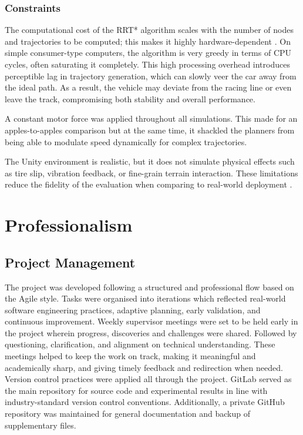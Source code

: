 \documentclass[a4paper,11pt]{report}
\begin{document}
\subsection{Constraints}

The computational cost of the RRT* algorithm scales with the number of nodes and trajectories to be computed; this makes 
it highly hardware-dependent \cite{reference3}. On simple consumer-type computers, the algorithm is very greedy in terms of CPU cycles, often saturating it completely. 
This high processing overhead introduces perceptible lag in trajectory generation, which can slowly veer the car away from the ideal path.
As a result, the vehicle may deviate from the racing line or even leave the track, compromising both stability and overall performance.

A constant motor force was applied throughout all simulations. This made for an apples-to-apples 
comparison but at the same time, it shackled the planners from being able to modulate speed dynamically for complex trajectories.

The Unity environment is realistic, but it does not simulate physical effects such as tire slip, vibration feedback, 
or fine-grain terrain interaction. These limitations reduce the fidelity of the evaluation when comparing to real-world deployment \cite{reference17}.


\newpage

\chapter{Professionalism}
\section{Project Management}

The project was developed following a structured and professional flow based on the Agile style. 
Tasks were organised into iterations which reflected real-world software engineering practices, adaptive 
planning, early validation, and continuous improvement. Weekly supervisor meetings were set to be held early 
in the project wherein progress, discoveries and challenges were shared. 
Followed by questioning, clarification, and alignment on technical understanding. These meetings helped to keep the work on track, 
making it meaningful and academically sharp, and giving timely feedback and redirection when needed. Version control practices were applied 
all through the project. GitLab served as the main repository for source code and experimental results in line with industry-standard version control conventions.
Additionally, a private GitHub repository was maintained for general documentation and backup of supplementary files.
\end{document}
